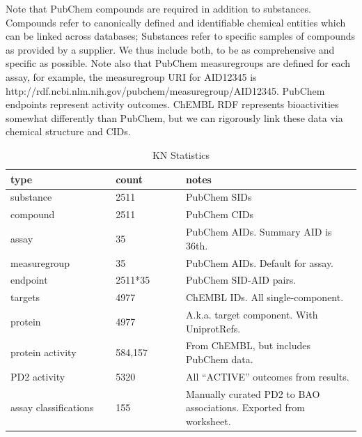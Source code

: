 Note that PubChem compounds are required in addition to substances.  Compounds refer to canonically defined and identifiable chemical entities which can be linked across databases; Substances refer to specific samples of compounds as provided by a supplier.  We thus include both, to be as comprehensive and specific as possible.   Note also that PubChem measuregroups are defined for each assay, for example, the measuregroup URI for AID12345 is http://rdf.ncbi.nlm.nih.gov/pubchem/measuregroup/AID12345.  PubChem endpoints represent activity outcomes.  ChEMBL RDF represents bioactivities somewhat differently than PubChem, but we can rigorously link these data via chemical structure and CIDs.

\begin{table}
\caption{KN Statistics}
\label{tab:opddr_03}
\centering
\begin{tabular}{p{0.3\linewidth}p{0.2\linewidth}p{0.5\linewidth}}
\hline
\textbf{type} & \textbf{count} & \textbf{notes} \\
\hline
substance & 2511 & PubChem SIDs \\
compound & 2511 & PubChem CIDs \\
assay & 35 & PubChem AIDs.  Summary AID is 36th. \\
measuregroup & 35 & PubChem AIDs.  Default for assay. \\
endpoint & 2511*35 & PubChem SID-AID pairs. \\
targets & 4977 & ChEMBL IDs.  All single-component. \\
protein & 4977 & A.k.a. target component.  With UniprotRefs. \\
protein activity & 584,157 & From ChEMBL, but includes PubChem data. \\
PD2 activity & 5320 & All “ACTIVE” outcomes from results. \\
assay classifications & 155 & Manually curated PD2 to BAO associations.  Exported from worksheet. \\
\hline
\end{tabular}
\end{table}

